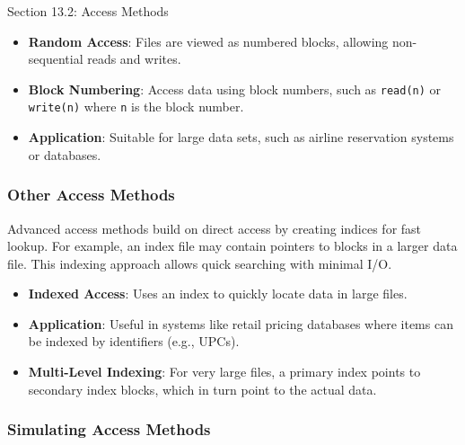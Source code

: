 \begin{notes}{Section 13.2: Access Methods}
    \begin{highlight}
    
        \begin{itemize}
            \item \textbf{Random Access}: Files are viewed as numbered blocks, allowing non-sequential reads and writes.
            \item \textbf{Block Numbering}: Access data using block numbers, such as \texttt{read(n)} or \texttt{write(n)} where \texttt{n} is the block number.
            \item \textbf{Application}: Suitable for large data sets, such as airline reservation systems or databases.
        \end{itemize}
    
    \end{highlight}
    
    \subsubsection*{Other Access Methods}
    
    Advanced access methods build on direct access by creating indices for fast lookup. For example, an index file may contain pointers to blocks in a larger data file. This indexing approach allows quick 
    searching with minimal I/O.
    
    \begin{highlight}
    
        \begin{itemize}
            \item \textbf{Indexed Access}: Uses an index to quickly locate data in large files.
            \item \textbf{Application}: Useful in systems like retail pricing databases where items can be indexed by identifiers (e.g., UPCs).
            \item \textbf{Multi-Level Indexing}: For very large files, a primary index points to secondary index blocks, which in turn point to the actual data.
        \end{itemize}
    
    \end{highlight}
    
    \subsubsection*{Simulating Access Methods}
    

\end{notes}
